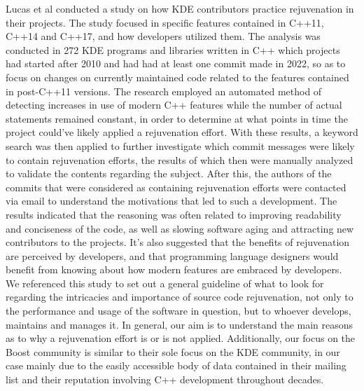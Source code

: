 Lucas et al\cite{lucas2023embracing} conducted a study on how KDE contributors practice rejuvenation in their projects. The study focused in specific features contained in C++11, C++14 and C++17, and how developers utilized them. The analysis was conducted in 272 KDE programs and libraries written in C++ which projects had started after 2010 and had had at least one commit made in 2022, so as to focus on changes on currently maintained code related to the features contained in post-C++11 versions. The research employed an automated method of detecting increases in use of modern C++ features while the number of actual statements remained constant, in order to determine at what points in time the project could've likely applied a rejuvenation effort. With these results, a keyword search was then applied to further investigate which commit messages were likely to contain rejuvenation efforts, the results of which then were manually analyzed to validate the contents regarding the subject. After this, the authors of the commits that were considered as containing rejuvenation efforts were contacted via email to understand the motivations that led to such a development. The results indicated that the reasoning was often related to improving readability and conciseness of the code, as well as slowing software aging and attracting new contributors to the projects. It's also suggested that the benefits of rejuvenation are perceived by developers, and that programming language designers would benefit from knowing about how modern features are embraced by developers. We referenced this study to set out a general guideline of what to look for regarding the intricacies and importance of source code rejuvenation, not only to the performance and usage of the software in question, but to whoever develops, maintains and manages it. In general, our aim is to understand the main reasons as to why a rejuvenation effort is or is not applied. Additionally, our focus on the Boost community is similar to their sole focus on the KDE community, in our case mainly due to the easily accessible body of data contained in their mailing list and their reputation involving C++ development throughout decades.

